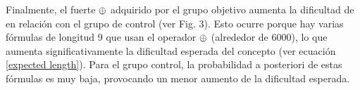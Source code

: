 Finalmente, el fuerte $ \oplus $ adquirido por el grupo objetivo aumenta la dificultad de \testb en relación con el grupo de control (ver Fig. 3). Esto ocurre porque hay varias fórmulas de longitud 9 que usan el operador $ \oplus $ (alrededor de 6000), lo que aumenta significativamente la dificultad esperada del concepto (ver ecuación \eqref{expected length}). Para el grupo  control, la probabilidad a posteriori  de estas fórmulas es muy baja, provocando un menor aumento de la dificultad esperada.

